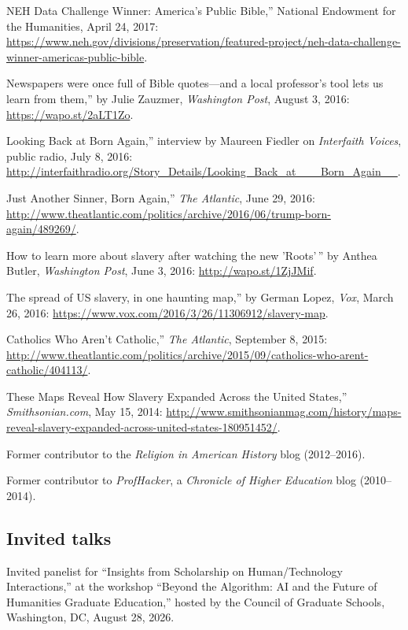 \documentclass[11pt]{article}
\begin{document}
\noindent{}NEH Data Challenge Winner: America's Public Bible,'' National Endowment for the Humanities, April 24, 2017: \url{https://www.neh.gov/divisions/preservation/featured-project/neh-data-challenge-winner-americas-public-bible}.

\noindent{}Newspapers were once full of Bible quotes---and a local professor's tool lets us learn from them,'' by Julie Zauzmer, \emph{Washington Post}, August 3, 2016: \url{https://wapo.st/2aLT1Zo}.

\noindent{}Looking Back at Born Again,'' interview by Maureen Fiedler on \emph{Interfaith Voices}, public radio, July 8, 2016: \url{http://interfaithradio.org/Story_Details/Looking_Back_at___Born_Again__}.

\noindent{}Just Another Sinner, Born Again,'' \emph{The Atlantic}, June 29, 2016: \url{http://www.theatlantic.com/politics/archive/2016/06/trump-born-again/489269/}.

\noindent{}How to learn more about slavery after watching the new 'Roots'\,'' by Anthea Butler, \emph{Washington Post}, June 3, 2016: \url{http://wapo.st/1ZjJMif}.

\noindent{}The spread of US slavery, in one haunting map,'' by German Lopez, \emph{Vox}, March 26, 2016: \url{https://www.vox.com/2016/3/26/11306912/slavery-map}.

\noindent{}Catholics Who Aren't Catholic,'' \emph{The Atlantic}, September 8, 2015:  \url{http://www.theatlantic.com/politics/archive/2015/09/catholics-who-arent-catholic/404113/}.

\noindent{}These Maps Reveal How Slavery Expanded Across the United States,'' \emph{Smithsonian.com}, May 15, 2014: \url{http://www.smithsonianmag.com/history/maps-reveal-slavery-expanded-across-united-states-180951452/}.

Former contributor to the \emph{Religion in American History} blog (2012--2016).

Former contributor to \emph{ProfHacker}, a \emph{Chronicle of Higher Education} blog (2010--2014). 

\subsection{Invited talks}\label{Invited talks}

Invited panelist for ``Insights from Scholarship on Human/Technology
Interactions,'' at the workshop ``Beyond the Algorithm: AI and the Future of
Humanities Graduate Education,'' hosted by the Council of Graduate Schools,
Washington, DC, August 28, 2026.
\end{document}
